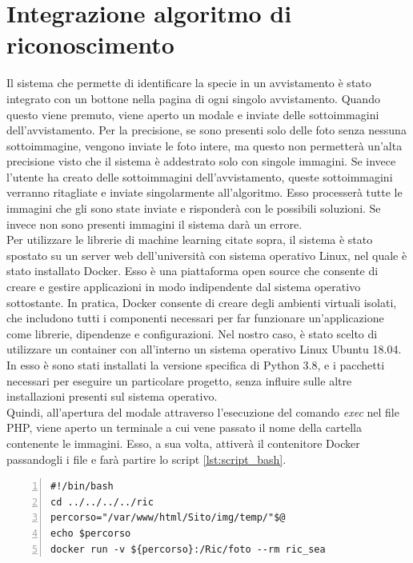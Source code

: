 \documentclass[a4paper,final,12pt]{report}
\begin{document}
\section{Integrazione algoritmo di riconoscimento}
Il sistema che permette di identificare la specie in un avvistamento è stato integrato con un bottone nella pagina di ogni singolo avvistamento. Quando questo viene premuto, viene aperto un modale e inviate delle sottoimmagini dell'avvistamento. Per la precisione, se sono presenti solo delle foto senza nessuna sottoimmagine, vengono inviate le foto intere, ma questo non permetterà un'alta precisione visto che il sistema è addestrato solo con singole immagini. Se invece l'utente ha creato delle sottoimmagini dell'avvistamento, queste sottoimmagini verranno ritagliate e inviate singolarmente all'algoritmo. Esso processerà tutte le immagini che gli sono state inviate e risponderà con le possibili soluzioni. Se invece non sono presenti immagini il sistema darà un errore.\\
Per utilizzare le librerie di machine learning citate sopra, il sistema è stato spostato su un server web dell'università con sistema operativo Linux, nel quale è stato installato Docker. Esso è una piattaforma open source che consente di creare e gestire applicazioni in modo indipendente dal sistema operativo sottostante. In pratica, Docker consente di creare degli ambienti virtuali isolati, che includono tutti i componenti necessari per far funzionare un'applicazione come librerie, dipendenze e configurazioni. Nel nostro caso, è stato scelto di utilizzare un container con all'interno un sistema operativo Linux Ubuntu 18.04. In esso è sono stati installati la versione specifica di Python 3.8, e i pacchetti necessari per eseguire un particolare progetto, senza influire sulle altre installazioni presenti sul sistema operativo.\\
Quindi, all'apertura del modale attraverso l'esecuzione del comando \textit{exec} nel file PHP, viene aperto un terminale a cui vene passato il nome della cartella contenente le immagini. Esso, a sua volta, attiverà il contenitore Docker passandogli i file e farà partire lo script \ref{lst:script_bash}.
\begin{lstlisting}[caption={Codice script bash.}, label={lst:script_bash}, breaklines, escapechar=`\%, frame=lines, basicstyle=\small\ttfamily, keepspaces=true, numbers=left]
#!/bin/bash
cd ../../../../ric
percorso="/var/www/html/Sito/img/temp/"$@
echo $percorso
docker run -v ${percorso}:/Ric/foto --rm ric_sea
\end{lstlisting}
\end{document}
